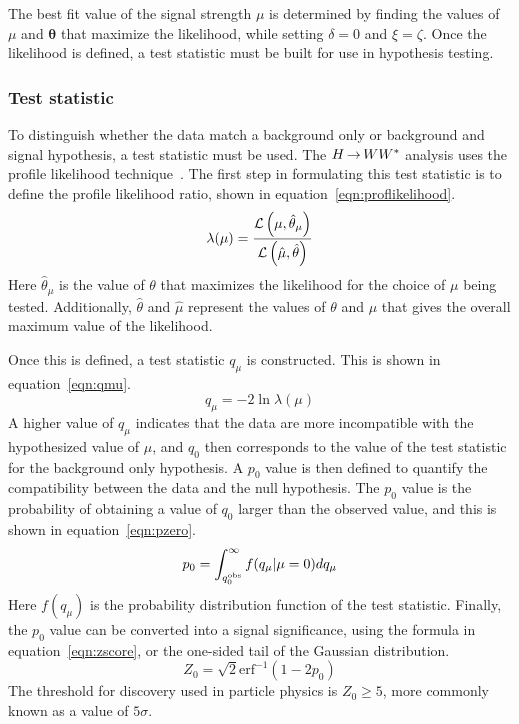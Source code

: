 The best fit value of the signal strength $\mu$ is determined by finding the values of $\mu$ and $\boldsymbol{\theta}$ that maximize the likelihood, while setting $\delta = 0$ and $\xi = \zeta$. Once the likelihood is defined, a test statistic must be built for use in hypothesis testing.

\subsubsection{Test statistic}

To distinguish whether the data match a background only or background and signal hypothesis, a test statistic must be used. The $H{\,{\rightarrow}\,}WW^\ast$ analysis uses the profile likelihood technique~\cite{Cowan:2010st}. The first step in formulating this test statistic is to define the profile likelihood ratio, shown in equation~\ref{eqn:proflikelihood}.
%
\begin{equation}
\lambda(\mu) = \frac{\mathcal{L}\left(\mu, \hat{\theta}_\mu\right)}{\mathcal{L}\left(\hat{\mu}, \hat{\theta}\right)}
\label{eqn:proflikelihood}
\end{equation}
%
Here $\hat{\theta}_\mu$ is the value of $\theta$ that maximizes the likelihood for the choice of $\mu$ being tested. Additionally, $\hat{\theta}$ and $\hat{\mu}$ represent the values of $\theta$ and $\mu$ that gives the overall maximum value of the likelihood. 

Once this is defined, a test statistic $q_\mu$ is constructed. This is shown in equation~\ref{eqn:qmu}.
%
\begin{equation}
q_\mu = -2 \ln \lambda(\mu)
\label{eqn:qmu}
\end{equation}
%
A higher value of $q_\mu$ indicates that the data are more incompatible with the hypothesized value of $\mu$, and $q_0$ then corresponds to the value of the test statistic for the background only hypothesis. A $p_0$ value is then defined to quantify the compatibility between the data and the null hypothesis. The $p_0$ value is the probability of obtaining a value of $q_0$ larger than the observed value, and this is shown in equation~\ref{eqn:pzero}.
%
\begin{equation}
p_0 = \int_{q_0^{\rm obs}}^{\infty} f(q_\mu | \mu = 0) d q_\mu
\label{eqn:pzero}
\end{equation}
%
Here $f(q_\mu)$ is the probability distribution function of the test statistic. Finally, the $p_0$ value can be converted into a signal significance, using the formula in equation~\ref{eqn:zscore}, or the one-sided tail of the Gaussian distribution. 
%
\begin{equation}
Z_0 = \sqrt{2} \text{erf}^{-1} (1-2p_0)
\label{eqn:zscore}
\end{equation}
%
The threshold for discovery used in particle physics is $Z_0 \geq 5$, more commonly known as a value of $5\sigma$.



